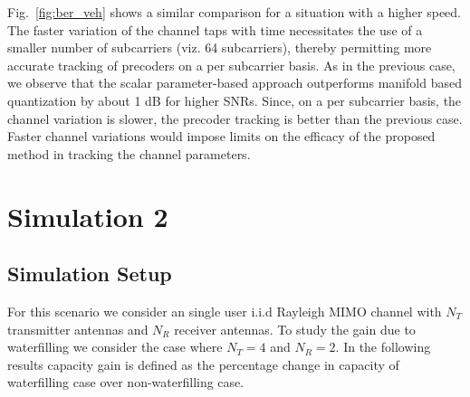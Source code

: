 \documentclass[11pt,a4paper]{report}
\begin{document}
Fig.~\ref{fig:ber_veh} shows a similar comparison for a situation with
a higher speed. The faster variation of the channel taps with time
necessitates the use of a smaller number of subcarriers (viz. 64
subcarriers), thereby permitting more accurate tracking of precoders
on a per subcarrier basis. As in the previous case, we observe that
the scalar parameter-based approach outperforms manifold based
quantization by about 1 dB for higher SNRs. Since, on a per subcarrier
basis, the channel variation is slower, the precoder tracking is
better than the previous case. Faster channel variations would impose
limits on the efficacy of the proposed method in tracking the channel
parameters.

\section{Simulation 2}
\subsection{Simulation Setup}
For this scenario we consider an single user i.i.d Rayleigh MIMO channel with
$N_T$ transmitter antennas and $N_R$ receiver antennas. To study
the gain due to waterfilling we consider the case where $N_T=4$ 
and $N_R=2$. In the following results capacity gain is defined as
the percentage change in capacity of waterfilling case over non-waterfilling
case.
\end{document}
